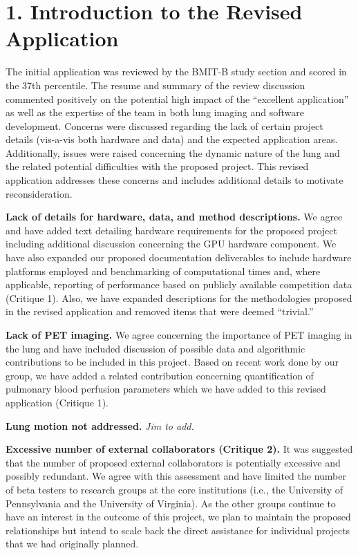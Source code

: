 \documentclass[11pt,]{article}
\title{}
\author{}
\date{}
\begin{document}
\maketitle


\section{1. Introduction to the Revised
Application}\label{introduction-to-the-revised-application}

The initial application was reviewed by the BMIT-B study section and
scored in the 37th percentile. The resume and summary of the review
discussion commented positively on the potential high impact of the
``excellent application'' as well as the expertise of the team in both
lung imaging and software development. Concerns were discussed regarding
the lack of certain project details (vis-a-vis both hardware and data)
and the expected application areas. Additionally, issues were raised
concerning the dynamic nature of the lung and the related potential
difficulties with the proposed project. This revised application
addresses these concerns and includes additional details to motivate
reconsideration.

\textbf{Lack of details for hardware, data, and method descriptions.} We
agree and have added text detailing hardware requirements for the
proposed project including additional discussion concerning the GPU
hardware component. We have also expanded our proposed documentation
deliverables to include hardware platforms employed and benchmarking of
computational times and, where applicable, reporting of performance
based on publicly available competition data (Critique 1). Also, we have
expanded descriptions for the methodologies proposed in the revised
application and removed items that were deemed ``trivial.''

\textbf{Lack of PET imaging.} We agree concerning the importance of PET
imaging in the lung and have included discussion of possible data and
algorithmic contributions to be included in this project. Based on
recent work done by our group, we have added a related contribution
concerning quantification of pulmonary blood perfusion parameters which
we have added to this revised application (Critique 1).

\textbf{Lung motion not addressed.} \emph{Jim to add.}

\textbf{Excessive number of external collaborators (Critique 2).} It was
suggested that the number of proposed external collaborators is
potentially excessive and possibly redundant. We agree with this
assessment and have limited the number of beta testers to research
groups at the core institutions (i.e., the University of Pennsylvania
and the University of Virginia). As the other groups continue to have an
interest in the outcome of this project, we plan to maintain the
proposed relationships but intend to scale back the direct assistance
for individual projects that we had originally planned.
\end{document}
